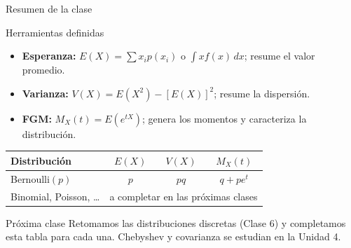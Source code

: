 \documentclass[aspectratio=169,11pt]{beamer}
\begin{document}
\begin{frame}{Resumen de la clase}
\begin{block}{Herramientas definidas}
\begin{itemize}
\item \textbf{Esperanza:} $E(X)=\sum x_i p(x_i)$ o $\int x f(x)\,dx$; resume el valor promedio.
\item \textbf{Varianza:} $V(X)=E(X^2)-[E(X)]^2$; resume la dispersión.
\item \textbf{FGM:} $M_X(t)=E(e^{tX})$; genera los momentos y caracteriza la distribución.
\end{itemize}
\end{block}

\begin{center}
\small
\begin{tabular}{lccc}
\toprule
\textbf{Distribución} & $E(X)$ & $V(X)$ & $M_X(t)$ \\
\midrule
Bernoulli$(p)$ & $p$ & $pq$ & $q+pe^t$ \\
Binomial, Poisson, \dots & \multicolumn{3}{c}{a completar en las próximas clases} \\
\bottomrule
\end{tabular}
\end{center}

\begin{alertblock}{Próxima clase}
Retomamos las distribuciones discretas (Clase 6) y completamos esta tabla para cada una. Chebyshev y covarianza se estudian en la Unidad 4.
\end{alertblock}
\end{frame}
\end{document}
